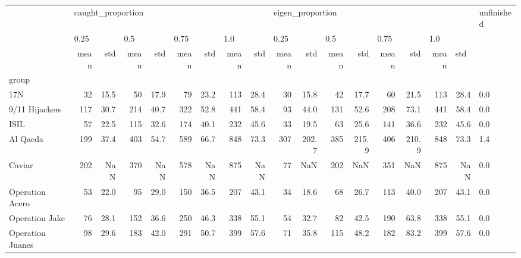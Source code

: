\begin{tabular}{lrrrrrrrrrrrrrrrrl}
\toprule
{} & \multicolumn{8}{l}{caught\_proportion} & \multicolumn{8}{l}{eigen\_proportion} & unfinished \\
{} & \multicolumn{2}{l}{0.25} & \multicolumn{2}{l}{0.5} & \multicolumn{2}{l}{0.75} & \multicolumn{2}{l}{1.0} & \multicolumn{2}{l}{0.25} & \multicolumn{2}{l}{0.5} & \multicolumn{2}{l}{0.75} & \multicolumn{3}{l}{1.0} \\
{} &              mean &   std & mean &   std & mean &   std & mean &   std &             mean &    std & mean &    std & mean &    std & mean & \multicolumn{2}{l}{std} \\
group                &                   &       &      &       &      &       &      &       &                  &        &      &        &      &        &      &       &            \\
\midrule
17N                  &                32 &  15.5 &   50 &  17.9 &   79 &  23.2 &  113 &  28.4 &               30 &   15.8 &   42 &   17.7 &   60 &   21.5 &  113 &  28.4 &        0.0 \\
9/11 Hijackers       &               117 &  30.7 &  214 &  40.7 &  322 &  52.8 &  441 &  58.4 &               93 &   44.0 &  131 &   52.6 &  208 &   73.1 &  441 &  58.4 &        0.0 \\
ISIL                 &                57 &  22.5 &  115 &  32.6 &  174 &  40.1 &  232 &  45.6 &               33 &   19.5 &   63 &   25.6 &  141 &   36.6 &  232 &  45.6 &        0.0 \\
Al Qaeda             &               199 &  37.4 &  403 &  54.7 &  589 &  66.7 &  848 &  73.3 &              307 &  202.7 &  385 &  215.9 &  406 &  210.9 &  848 &  73.3 &        1.4 \\
Caviar               &               202 &   NaN &  370 &   NaN &  578 &   NaN &  875 &   NaN &               77 &    NaN &  202 &    NaN &  351 &    NaN &  875 &   NaN &        0.0 \\
Operation Acero      &                53 &  22.0 &   95 &  29.0 &  150 &  36.5 &  207 &  43.1 &               34 &   18.6 &   68 &   26.7 &  113 &   40.0 &  207 &  43.1 &        0.0 \\
Operation Jake       &                76 &  28.1 &  152 &  36.6 &  250 &  46.3 &  338 &  55.1 &               54 &   32.7 &   82 &   42.5 &  190 &   63.8 &  338 &  55.1 &        0.0 \\
Operation Juanes     &                98 &  29.6 &  183 &  42.0 &  291 &  50.7 &  399 &  57.6 &               71 &   35.8 &  115 &   48.2 &  182 &   83.2 &  399 &  57.6 &        0.0 \\

\end{tabular}
